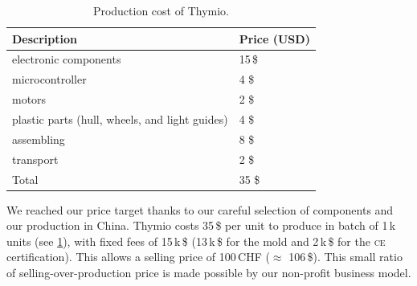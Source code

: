 \documentclass[letterpaper, 10 pt, conference]{ieeeconf}  %
\begin{document}
\begin{table}
\centering
\begin{tabularx}{\columnwidth}{ll}
\toprule
Description & Price (USD)\\
\midrule
electronic components & 15\,\$ \\
microcontroller & 4 \$ \\
motors & 2 \$ \\
plastic parts (hull, wheels, and light guides) & 4 \$ \\
assembling & 8 \$ \\
transport & 2 \$ \\
\bottomrule
Total & 35 \$ \\
\end{tabularx}
\caption{Production cost of Thymio.}
\label{tbl:thymio-price}
\end{table}

We reached our price target thanks to our careful selection of components and our production in China.
Thymio costs 35\,\$ per unit to produce in batch of 1\,k units (see \ref{tbl:thymio-price}), with fixed fees of 15\,k\,\$ (13\,k\,\$ for the mold and 2\,k\,\$ for the \textsc{ce} certification).
This allows a selling price of 100\,CHF ($\approx$ 106\,\$).
This small ratio of selling-over-production price is made possible by our non-profit business model.
\end{document}

